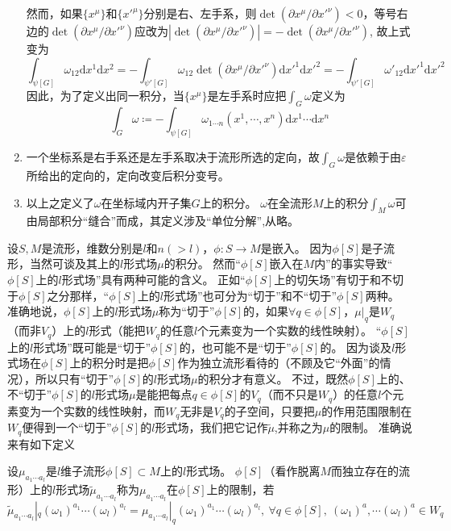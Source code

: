 \begin{note}
\begin{enumerate}[（1）]
        然而，如果$\{x^\mu\}$和$\{x'^\mu\}$分别是右、左手系，则$\det(\partial x^\mu / \partial x'^\nu) < 0$，等号右边的$\det(\partial x^\mu / \partial x'^\nu)$应改为$|\det(\partial x^\mu / \partial x'^\nu)| = -\det(\partial x^\mu / \partial x'^\nu)$, 故上式变为
        $$\int_{\psi[G]}\omega_{12}\mathrm{d}x^1\mathrm{d}x^2 = -\int_{\psi'[G]}\omega_{12}\det(\partial x^\mu / \partial x'^\nu)\mathrm{d}x'^1\mathrm{d}x'^2 = -\int_{\psi'[G]}\omega'_{12}\mathrm{d}x'^1\mathrm{d}x'^2$$
        因此，为了定义出同一积分，当$\{x^\mu\}$是左手系时应把$\displaystyle\int_G\omega$定义为
        $$\int_G\omega \coloneq -\int_{\psi[G]}\omega_{1 \cdots n}(x^1, \cdots, x^n)\mathrm{d}x^1 \cdots \mathrm{d}x^n$$
        \item 一个坐标系是右手系还是左手系取决于流形所选的定向，故$\displaystyle\int_G\omega$是依赖于由$\varepsilon$所给出的定向的，定向改变后积分变号。
        \item 以上之定义了$\omega$在坐标域内开子集$G$上的积分。
        $\omega$在全流形$M$上的积分$\displaystyle\int_M\omega$可由局部积分``缝合''而成，其定义涉及``单位分解'',从略。
    \end{enumerate}
\end{note}

设$S, M$是流形，维数分别是$l$和$n(>l)$，$\phi \colon S \to M$是嵌入。
因为$\phi[S]$是子流形，当然可谈及其上的$l$形式场$\mu$的积分。
然而``$\phi[S]$嵌入在$M$内''的事实导致``$\phi[S]$上的$l$形式场''具有两种可能的含义。
正如``$\phi[S]$上的切矢场''有切于和不切于$\phi[S]$之分那样，``$\phi[S]$上的$l$形式场''也可分为``切于''和不``切于''$\phi[S]$两种。
准确地说，$\phi[S]$上的$l$形式场$\mu$称为``切于''$\phi[S]$的，如果$\forall q \in \phi[S]$，$\mu|_q$是$W_q$（而非$V_q$）上的$l$形式（能把$W_q$的任意$l$个元素变为一个实数的线性映射）。
``$\phi[S]$上的$l$形式场''既可能是``切于''$\phi[S]$的，也可能不是``切于''$\phi[S]$的。
因为谈及$l$形式场在$\phi[S]$上的积分时是把$\phi[S]$作为独立流形看待的（不顾及它``外面''的情况），所以只有``切于''$\phi[S]$的$l$形式场$\mu$的积分才有意义。
不过，既然$\phi[S]$上的、不``切于''$\phi[S]$的$l$形式场$\mu$是能把每点$q \in \phi[S]$的$V_q$（而不只是$W_q$）的任意$l$个元素变为一个实数的线性映射，而$W_q$无非是$V_q$的子空间，只要把$\mu$的作用范围限制在$W_q$便得到一个``切于''$\phi[S]$的$l$形式场，我们把它记作$\tilde\mu$,并称之为$\mu$的限制。
准确说来有如下定义

\begin{definition}
    设$\mu_{a_1 \cdots a_l}$是$l$维子流形$\phi[S] \subset M$上的$l$形式场。
    $\phi[S]$（看作脱离$M$而独立存在的流形）上的$l$形式场$\tilde\mu_{a_1 \cdots a_l}$称为$\mu_{a_1 \cdots a_l}$在$\phi[S]$上的限制，若
    $$\tilde\mu_{a_1 \cdots a_l}|_q(\omega_1)^{a_1} \cdots (\omega_l)^{a_l} = \mu_{a_1 \cdots a_l}|_q(\omega_1)^{a_1} \cdots (\omega_l)^{a_l}, ~ \forall q \in \phi[S], ~ (\omega_1)^a, \cdots (\omega_l)^a \in W_q$$
\end{definition}

